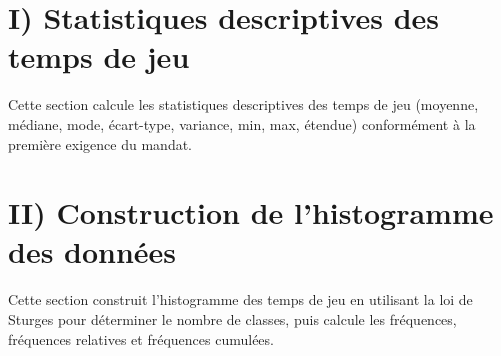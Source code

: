     \section{I) Statistiques descriptives des temps de
jeu}\label{i-statistiques-descriptives-des-temps-de-jeu}

Cette section calcule les statistiques descriptives des temps de jeu
(moyenne, médiane, mode, écart-type, variance, min, max, étendue)
conformément à la première exigence du mandat.



    \section{II) Construction de l'histogramme des
données}\label{ii-construction-de-lhistogramme-des-donnuxe9es}

Cette section construit l'histogramme des temps de jeu en utilisant la
loi de Sturges pour déterminer le nombre de classes, puis calcule les
fréquences, fréquences relatives et fréquences cumulées.

